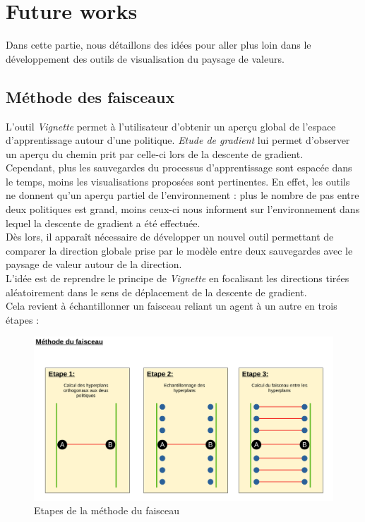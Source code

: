 \documentclass[12pt]{article}
\begin{document}
\section{Future works}
\label{future}

Dans cette partie, nous détaillons des idées pour aller plus loin dans le développement des outils de visualisation du paysage de valeurs. \\

\subsection{Méthode des faisceaux}

L'outil \emph{Vignette} permet à l'utilisateur d'obtenir un aperçu global de l'espace d'apprentissage autour d'une politique. \emph{Etude de gradient} lui permet d'observer un aperçu du chemin prit par celle-ci lors de la descente de gradient. \\

Cependant, plus les sauvegardes du processus d'apprentissage sont espacée dans le temps, moins les visualisations proposées sont pertinentes. En effet, les outils ne donnent qu'un aperçu partiel de l'environnement : plus le nombre de pas entre deux politiques est grand, moins ceux-ci nous informent sur l'environnement dans lequel la descente de gradient a été effectuée. \\

Dès lors, il apparaît nécessaire de développer un nouvel outil permettant de comparer la direction globale prise par le modèle entre deux sauvegardes avec le paysage de valeur autour de la direction. \\

L'idée est de reprendre le principe de \emph{Vignette} en focalisant les directions tirées aléatoirement dans le sens de déplacement de la descente de gradient. \\

Cela revient à échantillonner un faisceau reliant un agent à un autre en trois étapes : \\

\begin{figure}[htp]
    \centering
    \includegraphics[width=18cm]{Images/faisceaux}
    \caption{Etapes de la méthode du faisceau}
    \label{fig:faisceaux}
\end{figure}
\end{document}
